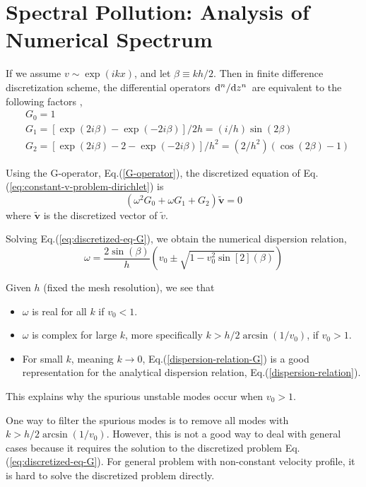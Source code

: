 \chapter{Spectral Pollution: Analysis of Numerical Spectrum}
If we assume $v\sim \exp(ikx)$, and let $\beta\equiv kh/2$. Then in finite difference discretization scheme, the differential operators $\dv*[n]{z}$ are equivalent to the following factors \cite{llobet_spectral_1990},
\begin{align}
	&G_0 = 1 \nonumber \\
	&G_1 = [\exp(2i\beta)-\exp(-2i\beta)]/2h = (i/h)\sin(2\beta) 
	\label{G-operator}\\
	&G_2 = [\exp(2i\beta)-2-\exp(-2i\beta)]/h^2 = (2/h^2)(\cos(2\beta)-1) \nonumber 
\end{align}

Using the G-operator, Eq.(\ref{G-operator}), the discretized equation of Eq.(\ref{eq:constant-v-problem-dirichlet}) is 
\begin{equation} \label{eq:discretized-eq-G}
    (\omega^2G_0 + \omega G_1 + G_2)\mathbf{\tilde{v}} = 0
\end{equation}
where $\mathbf{\tilde{v}}$ is the discretized vector of $\tilde{v}$.

Solving Eq.(\ref{eq:discretized-eq-G}), we obtain the numerical dispersion relation,
\begin{equation} \label{dispersion-relation-G}
	\omega = \frac{2\sin(\beta)}{h}\left(v_0 \pm \sqrt{1 - v_0^2\sin[2](\beta)}\right)
\end{equation}

Given $h$ (fixed the mesh resolution), we see that
\begin{itemize}
	\item $\omega$ is real for all $k$ if $v_0 < 1$.
	\item $\omega$ is complex for large $k$, more specifically $k>h/2\arcsin(1/v_0)$, if $v_0 > 1$.
	\item For small $k$, meaning $k\to 0$, Eq.(\ref{dispersion-relation-G}) is a good representation for the analytical dispersion relation, Eq.(\ref{dispersion-relation}). 
\end{itemize}
This explains why the spurious unstable modes occur when $v_0>1$.

One way to filter the spurious modes is to remove all modes with $k>h/2 \arcsin(1/v_0)$. However, this is not a good way to deal with general cases because it requires the solution to the discretized problem Eq.(\ref{eq:discretized-eq-G}). For general problem with non-constant velocity profile, it is hard to solve the discretized problem directly.
